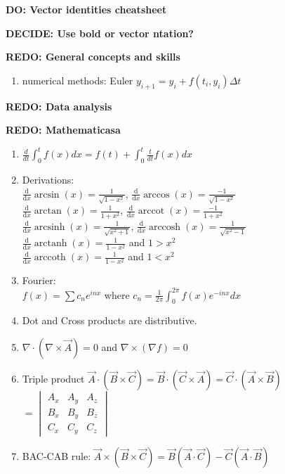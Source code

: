 \documentclass{article}
\renewcommand\d{\mathrm d}
\DeclareMathOperator{\arccot}{arccot}
\DeclareMathOperator{\arcsinh}{arcsinh}
\DeclareMathOperator{\arccosh}{arccosh}
\DeclareMathOperator{\arctanh}{arctanh}
\DeclareMathOperator{\arccoth}{arccoth}
\begin{document}
\begin{multicols}{3}
    \textbf{{\color{red} DO: Vector identities cheatsheet}}

    \textbf{{\color{red} DECIDE: Use bold or vector ntation?}}

    \textbf{{\color{red} REDO: }General concepts and skills}

    \begin{enumerate}

        \item numerical methods: Euler $y_{i+1}=y_i+f(t_i,y_i)\Delta t$

    \end{enumerate}

    \textbf{{\color{red} REDO: }Data analysis}

    \textbf{{\color{red} REDO: }Mathematicasa}

    \begin{enumerate}
        \item $\frac{d}{dt}\int_0^tf(x)dx=f(t)+\int_0^t\frac{t}{dt}f(x)dx$
        \item Derivations: \\
            $\frac{\d}{\d x}\arcsin(x)=\frac{1}{\sqrt{1-x^2}}$,
            $\frac{\d}{\d x}\arccos(x)=\frac{-1}{\sqrt{1-x^2}}$\\
            $\frac{\d}{\d x}\arctan(x)=\frac{1}{1+x^2}$,
            $\frac{\d}{\d x}\arccot(x)=\frac{-1}{1+x^2}$\\
            $\frac{\d}{\d x}\arcsinh(x)=\frac{1}{\sqrt{x^2+1}}$,
            $\frac{\d}{\d x}\arccosh(x)=\frac{1}{\sqrt{x^2-1}}$\\
            $\frac{\d}{\d x}\arctanh(x)=\frac{1}{1-x^2}$ and $1>x^2$\\
            $\frac{\d}{\d x}\arccoth(x)=\frac{1}{1-x^2}$ and $1<x^2$
        \item Fourier: \\
            $f(x)=\sum c_ne^{inx}$ where $c_n=\frac{1}{2\pi}\int_0^{2\pi}f(x)e^{-inx}dx$
        \item Dot and Cross products are distributive.
        \item $\nabla\cdot(\nabla\times\vec{A})=0$ and
            $\nabla\times(\nabla f)=0$
        \item Triple product $\vec{A}\cdot(\vec{B}\times\vec{C}) =\vec{B}\cdot(\vec{C}\times\vec{A})
         =\vec{C}\cdot(\vec{A}\times\vec{B})$
         $=\begin{vmatrix}
             A_x & A_y & A_z \\
             B_x & B_y & B_z \\
             C_x & C_y & C_z
         \end{vmatrix}$
        \item BAC-CAB rule: $\vec{A}\times(\vec{B}\times\vec{C})
         =\vec{B}(\vec{A}\cdot\vec{C})-\vec{C}(\vec{A}\cdot\vec{B})$
    \end{enumerate}


\end{multicols}
\end{document}
